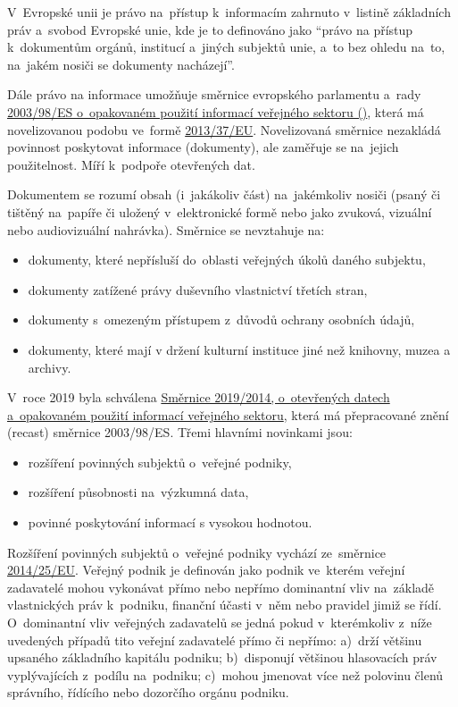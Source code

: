 V~Evropské unii je právo na~přístup k~informacím zahrnuto v~listině základních práv a~svobod Evropské unie, kde je to definováno jako \enquote{právo na přístup k~dokumentům orgánů, institucí a~jiných subjektů unie, a~to bez ohledu na~to, na~jakém nosiči se dokumenty nacházejí}.

Dále právo na informace umožňuje směrnice evropského parlamentu a~rady \href{https://eur-lex.europa.eu/legal-content/CS/TXT/?uri=celex\%3A32003L0098}{2003/98/ES o~opakovaném použití informací veřejného sektoru ()}, která má novelizovanou podobu ve~formě \href{https://eur-lex.europa.eu/legal-content/EN/TXT/?uri=CELEX:02003L0098-20130717}{2013/37/EU}. Novelizovaná směrnice nezakládá povinnost poskytovat informace (dokumenty), ale zaměřuje se na~jejich použitelnost. Míří k~podpoře otevřených dat.

Dokumentem se rozumí obsah (i~jakákoliv část) na~jakémkoliv nosiči (psaný či tištěný na~papíře či uložený v~elektronické formě nebo jako zvuková, vizuální nebo audiovizuální nahrávka). Směrnice se nevztahuje na:

\begin{itemize}
    \item dokumenty, které nepřísluší do~oblasti veřejných úkolů daného subjektu,
    \item dokumenty zatížené právy duševního vlastnictví třetích stran,
    \item dokumenty s~omezeným přístupem z~důvodů ochrany osobních údajů,
    \item dokumenty, které mají v držení kulturní instituce jiné než knihovny, muzea a archivy.
\end{itemize}

V~roce 2019 byla schválena \href{https://eur-lex.europa.eu/legal-content/CS/TXT/?uri=CELEX:32019L1024}{Směrnice 2019/2014, o~otevřených datech a~opakovaném použití informací veřejného sektoru}, která má přepracované znění (recast) směrnice 2003/98/ES. Třemi hlavními novinkami jsou:

\begin{itemize}
    \item rozšíření povinných subjektů o~veřejné podniky,
    \item rozšíření působnosti na~výzkumná data,
    \item povinné poskytování informací s vysokou hodnotou.
\end{itemize}

Rozšíření povinných subjektů o~veřejné podniky vychází ze~směrnice \href{https://eur-lex.europa.eu/legal-content/en/TXT/?uri=CELEX:32014L0025}{2014/25/EU}. Veřejný podnik je definován jako podnik ve~kterém veřejní zadavatelé mohou vykonávat přímo nebo nepřímo dominantní vliv na~základě vlastnických práv k~podniku, finanční účasti v~něm nebo pravidel jimiž se řídí. O~dominantní vliv veřejných zadavatelů se jedná pokud v~kterémkoliv z~níže uvedených případů tito veřejní zadavatelé přímo či nepřímo: a)~drží většinu upsaného základního kapitálu podniku; b)~disponují většinou hlasovacích práv vyplývajících z~podílu na~podniku; c)~mohou jmenovat více než polovinu členů správního, řídícího nebo dozorčího orgánu podniku.

